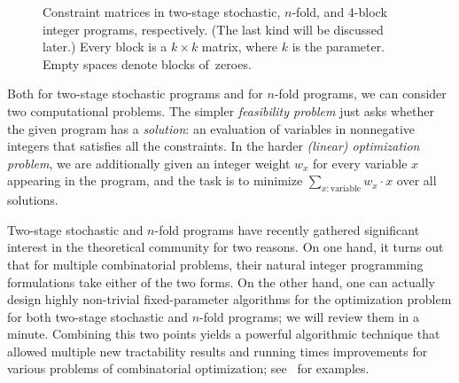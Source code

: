 \documentclass{article}
\begin{document}
\begin{figure}[h]
\centering
{}

    \caption{Constraint matrices in two-stage stochastic, $n$-fold, and $4$-block integer programs, respectively. (The last kind will be discussed later.) Every block is a $k\times k$ matrix, where $k$ is the parameter. Empty spaces denote blocks of~zeroes.}\label{fig:blocks}
\end{figure}

Both for two-stage stochastic programs and for $n$-fold programs, we can consider two computational problems. The simpler {\em{feasibility problem}} just asks whether the given program has a {\em{solution}}: an evaluation of variables in nonnegative integers that satisfies all the constraints. In the harder {\em{(linear) optimization problem}}, we are additionally given an integer weight $w_x$ for every variable $x$ appearing in the program, and the task is to minimize $\sum_{x\colon \text{variable}} w_x\cdot x$ over all solutions.

Two-stage stochastic and $n$-fold programs have recently gathered significant interest in the theoretical community for two reasons. On one hand, it turns out that for multiple combinatorial problems, their natural integer programming formulations take either of the two forms. On the other hand, one can actually design highly non-trivial fixed-parameter algorithms for the optimization problem for both two-stage stochastic and $n$-fold programs; we will review them in a minute. Combining this two points yields a powerful algorithmic technique that allowed multiple new tractability results and running times improvements for various problems of combinatorial optimization; see~\cite{ChenMYZ17,GavenciakKK22,JansenKMR22,KnopK18,KnopK22,KnopKLMO21,KnopKM20,KnopKM20b,KouteckyZ20} for examples.
\end{document}
